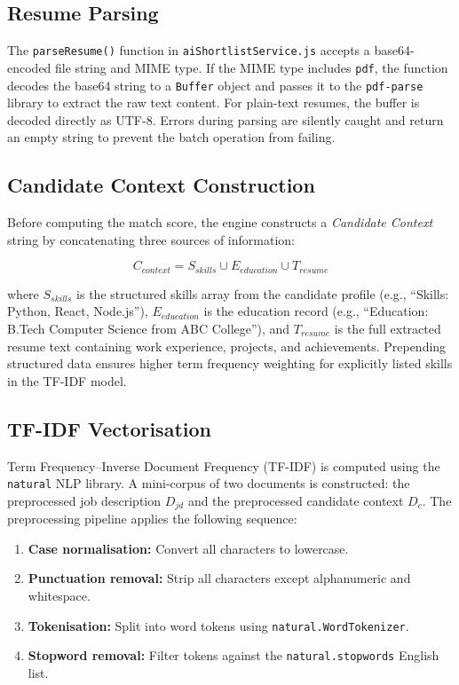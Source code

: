 \documentclass[12pt,a4paper]{report}
\begin{document}
\subsection{Resume Parsing}

The \texttt{parseResume()} function in \texttt{aiShortlistService.js} accepts a base64-encoded file string and MIME type. If the MIME type includes \texttt{pdf}, the function decodes the base64 string to a \texttt{Buffer} object and passes it to the \texttt{pdf-parse} library to extract the raw text content. For plain-text resumes, the buffer is decoded directly as UTF-8. Errors during parsing are silently caught and return an empty string to prevent the batch operation from failing.

\subsection{Candidate Context Construction}

Before computing the match score, the engine constructs a \textit{Candidate Context} string by concatenating three sources of information:

\begin{equation}
    C_{context} = S_{skills} \cup E_{education} \cup T_{resume}
\end{equation}

where $S_{skills}$ is the structured skills array from the candidate profile (e.g., ``Skills: Python, React, Node.js''), $E_{education}$ is the education record (e.g., ``Education: B.Tech Computer Science from ABC College''), and $T_{resume}$ is the full extracted resume text containing work experience, projects, and achievements. Prepending structured data ensures higher term frequency weighting for explicitly listed skills in the TF-IDF model.

\subsection{TF-IDF Vectorisation}

Term Frequency--Inverse Document Frequency (TF-IDF) is computed using the \texttt{natural} NLP library. A mini-corpus of two documents is constructed: the preprocessed job description $D_{jd}$ and the preprocessed candidate context $D_{c}$. The preprocessing pipeline applies the following sequence:

\begin{enumerate}[leftmargin=*, label=(\arabic*)]
    \item \textbf{Case normalisation:} Convert all characters to lowercase.
    \item \textbf{Punctuation removal:} Strip all characters except alphanumeric and whitespace.
    \item \textbf{Tokenisation:} Split into word tokens using \texttt{natural.WordTokenizer}.
    \item \textbf{Stopword removal:} Filter tokens against the \texttt{natural.stopwords} English list.
\end{enumerate}
\end{document}
